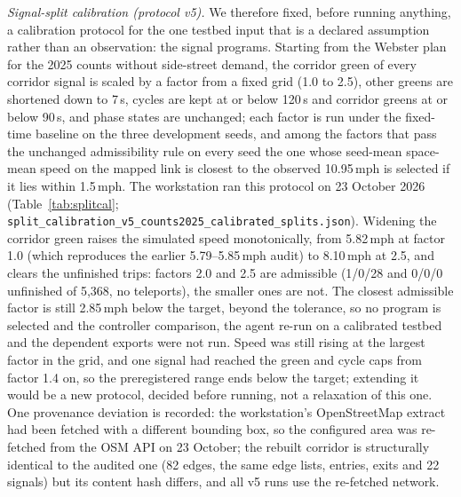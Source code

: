 \textit{Signal-split calibration (protocol v5).} We therefore fixed, before running anything, a calibration protocol
for the one testbed input that is a declared assumption rather than an observation: the signal programs. Starting
from the Webster plan for the 2025 counts without side-street demand, the corridor green of every corridor signal is
scaled by a factor from a fixed grid (1.0 to 2.5), other greens are shortened down to 7\,s, cycles are kept at or
below 120\,s and corridor greens at or below 90\,s, and phase states are unchanged; each factor is run under the
fixed-time baseline on the three development seeds, and among the factors that pass the unchanged admissibility rule
on every seed the one whose seed-mean space-mean speed on the mapped link is closest to the observed 10.95\,mph is
selected if it lies within 1.5\,mph. The workstation ran this protocol on 23 October 2026 (Table~\ref{tab:splitcal};
\texttt{split\_calibration\_v5\_counts2025\_calibrated\_splits.json}). Widening the corridor green raises the
simulated speed monotonically, from 5.82\,mph at factor 1.0 (which reproduces the earlier 5.79--5.85\,mph audit) to
8.10\,mph at 2.5, and clears the unfinished trips: factors 2.0 and 2.5 are admissible (1/0/28 and 0/0/0 unfinished of
5{,}368, no teleports), the smaller ones are not. The closest admissible factor is still 2.85\,mph below the target,
beyond the tolerance, so no program is selected and the controller comparison, the agent re-run on a calibrated
testbed and the dependent exports were not run. Speed was still rising at the largest factor in the grid, and one
signal had reached the green and cycle caps from factor 1.4 on, so the preregistered range ends below the target;
extending it would be a new protocol, decided before running, not a relaxation of this one. One provenance deviation
is recorded: the workstation's OpenStreetMap extract had been fetched with a different bounding box, so the configured
area was re-fetched from the OSM API on 23 October; the rebuilt corridor is structurally identical to the audited one
(82 edges, the same edge lists, entries, exits and 22 signals) but its content hash differs, and all v5 runs use the
re-fetched network.

